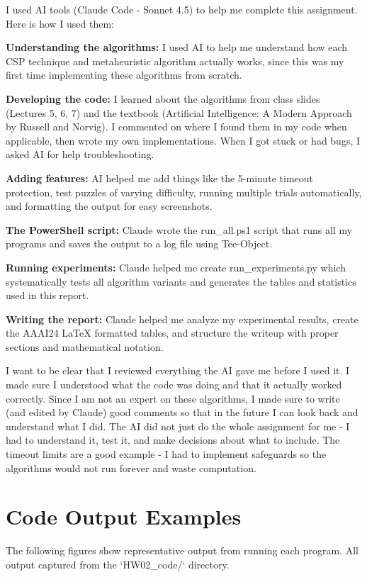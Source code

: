 \documentclass[letterpaper]{article}
\begin{document}
I used AI tools (Claude Code - Sonnet 4.5) to help me complete this assignment. Here is how I used them:

\textbf{Understanding the algorithms:} I used AI to help me understand how each CSP technique and metaheuristic algorithm actually works, since this was my first time implementing these algorithms from scratch.

\textbf{Developing the code:} I learned about the algorithms from class slides (Lectures 5, 6, 7) and the textbook (Artificial Intelligence: A Modern Approach by Russell and Norvig). I commented on where I found them in my code when applicable, then wrote my own implementations. When I got stuck or had bugs, I asked AI for help troubleshooting.

\textbf{Adding features:} AI helped me add things like the 5-minute timeout protection, test puzzles of varying difficulty, running multiple trials automatically, and formatting the output for easy screenshots.

\textbf{The PowerShell script:} Claude wrote the run\_all.ps1 script that runs all my programs and saves the output to a log file using Tee-Object.

\textbf{Running experiments:} Claude helped me create run\_experiments.py which systematically tests all algorithm variants and generates the tables and statistics used in this report.

\textbf{Writing the report:} Claude helped me analyze my experimental results, create the AAAI24 LaTeX formatted tables, and structure the writeup with proper sections and mathematical notation.

I want to be clear that I reviewed everything the AI gave me before I used it. I made sure I understood what the code was doing and that it actually worked correctly. Since I am not an expert on these algorithms, I made sure to write (and edited by Claude) good comments so that in the future I can look back and understand what I did. The AI did not just do the whole assignment for me - I had to understand it, test it, and make decisions about what to include. The timeout limits are a good example - I had to implement safeguards so the algorithms would not run forever and waste computation.

\section{Code Output Examples}

The following figures show representative output from running each program. All output captured from the `HW02\_code/` directory.
\end{document}

